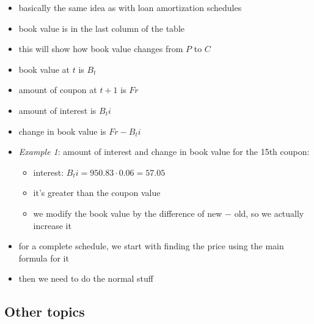 \documentclass[../00_main.tex]{subfiles}
\begin{document}
\begin{itemize}
    \item basically the same idea as with loan amortization schedules
    \item book value is in the last column of the table
    \item this will show how book value changes from $P$ to $C$
    \item book value at $t$ is $B_t$
    \item amount of coupon at $t+1$ is $Fr$
    \item amount of interest is $B_t i$
    \item change in book value is $Fr - B_t i$
    \item \textit{Example 1}: amount of interest and change in book value for
        the 15th coupon:
        \begin{itemize}
            \item interest: $B_t i = 950.83 \cdot 0.06 = 57.05$
            \item it's greater than the coupon value
            \item we modify the book value by the difference of new $-$ old, so
                we actually increase it
        \end{itemize}
    \item for a complete schedule, we start with finding the price using the
        main formula for it
    \item then we need to do the normal stuff
\end{itemize}

\subsection{Other topics}
\end{document}
